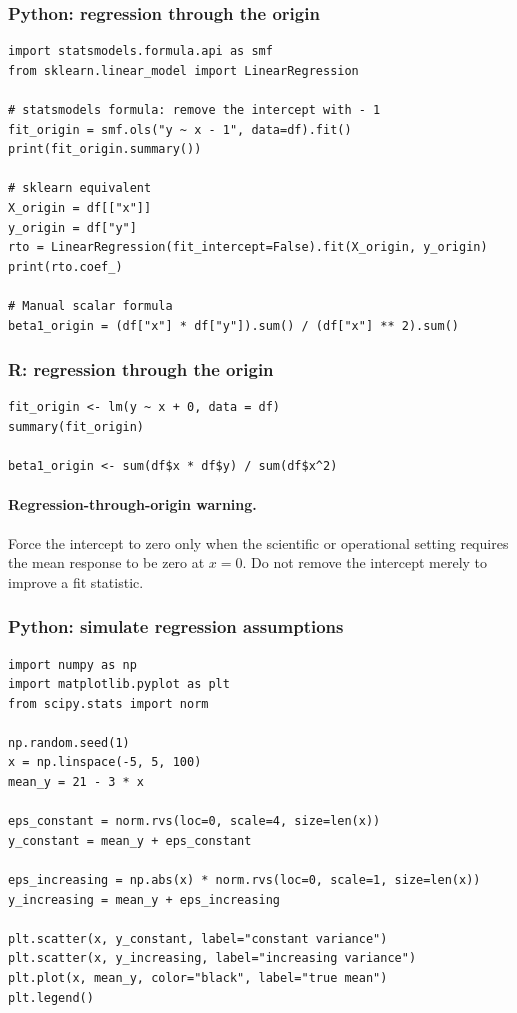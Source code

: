 \subsubsection*{Python: regression through the origin}

\begin{verbatim}
import statsmodels.formula.api as smf
from sklearn.linear_model import LinearRegression

# statsmodels formula: remove the intercept with - 1
fit_origin = smf.ols("y ~ x - 1", data=df).fit()
print(fit_origin.summary())

# sklearn equivalent
X_origin = df[["x"]]
y_origin = df["y"]
rto = LinearRegression(fit_intercept=False).fit(X_origin, y_origin)
print(rto.coef_)

# Manual scalar formula
beta1_origin = (df["x"] * df["y"]).sum() / (df["x"] ** 2).sum()
\end{verbatim}

\subsubsection*{R: regression through the origin}

\begin{verbatim}
fit_origin <- lm(y ~ x + 0, data = df)
summary(fit_origin)

beta1_origin <- sum(df$x * df$y) / sum(df$x^2)
\end{verbatim}

\paragraph{Regression-through-origin warning.} Force the intercept to zero only when the scientific or operational setting requires the mean response to be zero at \(x=0\).  Do not remove the intercept merely to improve a fit statistic.

\subsubsection*{Python: simulate regression assumptions}

\begin{verbatim}
import numpy as np
import matplotlib.pyplot as plt
from scipy.stats import norm

np.random.seed(1)
x = np.linspace(-5, 5, 100)
mean_y = 21 - 3 * x

eps_constant = norm.rvs(loc=0, scale=4, size=len(x))
y_constant = mean_y + eps_constant

eps_increasing = np.abs(x) * norm.rvs(loc=0, scale=1, size=len(x))
y_increasing = mean_y + eps_increasing

plt.scatter(x, y_constant, label="constant variance")
plt.scatter(x, y_increasing, label="increasing variance")
plt.plot(x, mean_y, color="black", label="true mean")
plt.legend()
\end{verbatim}

